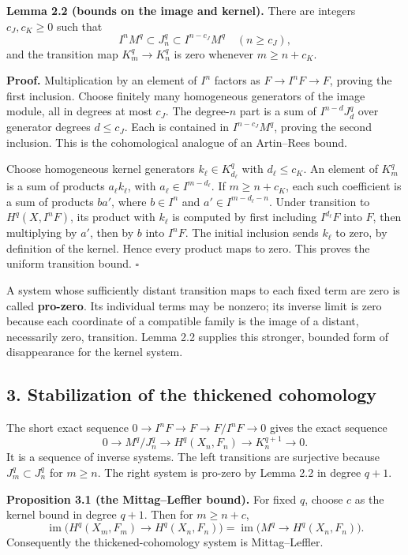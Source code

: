 \documentclass[11pt]{article}
\begin{document}
\textbf{Lemma 2.2 (bounds on the image and kernel).} There are integers
\(c_J,c_K\geq0\) such that \[
I^nM^q\subset J_n^q\subset I^{n-c_J}M^q\quad(n\geq c_J),
\] and the transition map \(K_m^q\to K_n^q\) is zero whenever
\(m\geq n+c_K\).

\textbf{Proof.} Multiplication by an element of \(I^n\) factors as
\(F\to I^nF\to F\), proving the first inclusion. Choose finitely many
homogeneous generators of the image module, all in degrees at most
\(c_J\). The degree-\(n\) part is a sum of \(I^{n-d}J_d^q\) over
generator degrees \(d\leq c_J\). Each is contained in \(I^{n-c_J}M^q\),
proving the second inclusion. This is the cohomological analogue of an
Artin--Rees bound.

Choose homogeneous kernel generators \(k_\ell\in K_{d_\ell}^q\) with
\(d_\ell\leq c_K\). An element of \(K_m^q\) is a sum of products
\(a_\ell k_\ell\), with \(a_\ell\in I^{m-d_\ell}\). If \(m\geq n+c_K\),
each such coefficient is a sum of products \(ba'\), where \(b\in I^n\)
and \(a'\in I^{m-d_\ell-n}\). Under transition to \(H^q(X,I^nF)\), its
product with \(k_\ell\) is computed by first including \(I^{d_\ell}F\)
into \(F\), then multiplying by \(a'\), then by \(b\) into \(I^nF\). The
initial inclusion sends \(k_\ell\) to zero, by definition of the kernel.
Hence every product maps to zero. This proves the uniform transition
bound. \(\square\)

A system whose sufficiently distant transition maps to each fixed term
are zero is called \textbf{pro-zero}. Its individual terms may be
nonzero; its inverse limit is zero because each coordinate of a
compatible family is the image of a distant, necessarily zero,
transition. Lemma 2.2 supplies this stronger, bounded form of
disappearance for the kernel system.

\subsection{3. Stabilization of the thickened
cohomology}\label{stabilization-of-the-thickened-cohomology}

The short exact sequence \(0\to I^nF\to F\to F/I^nF\to0\) gives the
exact sequence \[
0\to M^q/J_n^q\longrightarrow H^q(X_n,F_n)\longrightarrow K_n^{q+1}\to0.
\tag{1}
\] It is a sequence of inverse systems. The left transitions are
surjective because \(J_m^q\subset J_n^q\) for \(m\geq n\). The right
system is pro-zero by Lemma 2.2 in degree \(q+1\).

\textbf{Proposition 3.1 (the Mittag--Leffler bound).} For fixed \(q\),
choose \(c\) as the kernel bound in degree \(q+1\). Then for
\(m\geq n+c\), \[
\operatorname{im}\bigl(H^q(X_m,F_m)\to H^q(X_n,F_n)\bigr)
=\operatorname{im}\bigl(M^q\to H^q(X_n,F_n)\bigr).
\] Consequently the thickened-cohomology system is Mittag--Leffler.
\end{document}
